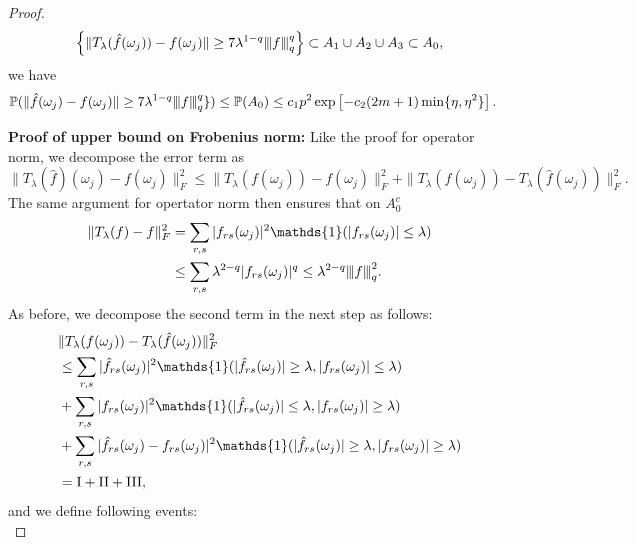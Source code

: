 \begin{proof}
\begin{equation*}
\left\{\|T_\lambda(\hat{f}(\omega_j))-f(\omega_j)\|
\ge 7\lambda^{1-q}{\left\vert\kern-0.25ex\left\vert\kern-0.25ex\left\vert f \right\vert\kern-0.25ex\right\vert\kern-0.25ex\right\vert}_q^q\right\} \subset A_1\cup A_2 \cup A_3 \subset A_0,
\end{equation*}
we have 
\begin{equation*}
\begin{aligned}
&\mathbb{P}(\|\hat{f}(\omega_j)-f(\omega_j)\| 
\ge 7\lambda^{1-q}{\left\vert\kern-0.25ex\left\vert\kern-0.25ex\left\vert f \right\vert\kern-0.25ex\right\vert\kern-0.25ex\right\vert}_q^q\})
\le \mathbb{P}(A_0) \le c_1p^2\exp\left[-c_2(2m+1)\min\{\eta, \eta^2\}\right]. \end{aligned}
\end{equation*}
\par
\smallskip
\noindent\textbf{Proof of upper bound on Frobenius norm: } Like the proof for operator norm, we decompose the error term as 
\begin{equation}
\|T_\lambda(\hat{f})(\omega_j)-f(\omega_j)\|_F^2 \le \|T_\lambda(f(\omega_j))-f(\omega_j)\|_F^2+\|T_\lambda(f(\omega_j))-T_\lambda(\hat{f}(\omega_j))\|_F^2. \nonumber
\end{equation}
The same argument for opertator norm then ensures that on $A_0^c$
\begin{equation*}
\begin{aligned}
\|T_\lambda(f)-f\|_F^2 &= \sum_{r,s} |f_{rs}(\omega_j)|^2\mathds{1}(|f_{rs}(\omega_j)|\le \lambda)\\
& \le \sum_{r,s} \lambda^{2-q} |f_{rs}(\omega_j)|^q \le \lambda^{2-q}\vertiii{f}_q^2. 
\end{aligned}
\end{equation*}
As before, we decompose the second term in the next step as follows:
\begin{equation*}
\begin{aligned}
&\|T_\lambda(f(\omega_j))-T_\lambda(\hat{f}(\omega_j))\|_F^2 \\
&\le \sum_{r,s} |\hat{f}_{rs}(\omega_j)|^2\mathds{1}(|\hat{f}_{rs}(\omega_j)|\ge \lambda, |f_{rs}(\omega_j)|\le \lambda)\\
&+\sum_{r,s} |f_{rs}(\omega_j)|^2 \mathds{1}(|\hat{f}_{rs}(\omega_j)|\le \lambda, |f_{rs}(\omega_j)|\ge \lambda)\\
&+ \sum_{r,s} |\hat{f}_{rs}(\omega_j)-f_{rs}(\omega_j)|^2\mathds{1}(|\hat{f}_{rs}(\omega_j)|\ge \lambda, |f_{rs}(\omega_j)|\ge \lambda)\\
&= \rm{I}+\rm{II}+\rm{III},
\end{aligned}
\end{equation*}
and we define following events:
\begin{equation*}

\end{equation*}
\end{proof}
